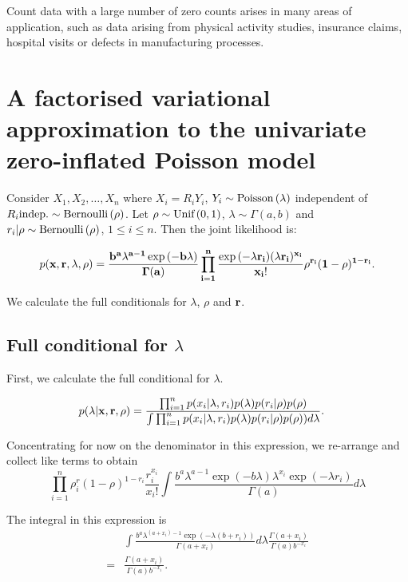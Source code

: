 \documentclass{amsart}
\begin{document}
Count data with a large number of zero counts arises in many areas of
application, such as data arising from physical activity studies, 
insurance claims, hospital visits or defects in manufacturing processes.

\section{A factorised variational approximation to the univariate zero-inflated Poisson model}

\noindent Consider $X_1, X_2, \ldots, X_n$ where $X_i = R_i Y_i$, $Y_i \sim \text{Poisson} \left( \lambda \right)$ independent of
$R_i \text{indep.} \sim \text{Bernoulli} \left( \rho \right)$. Let $\rho \sim \text{Unif} \left( 0, 1 \right)$, 
$\lambda \sim \Gamma(a, b)$ and $r_i | \rho \sim \text{Bernoulli} \left( \rho \right)$, $1 
\leq i \leq n$. Then the joint likelihood is:

$$
p(\bf x, \bf r, \lambda, \rho) = \frac{b^a \lambda^{a - 1} \exp{(-b \lambda)}}{\Gamma{(a)}} \prod_{i=1}^n \frac{\exp{(-\lambda r_i)} (\lambda r_i)^{x_i}}{x_i !} \rho^{r_i} (1 - \rho)^{1 - r_i}.
$$

\noindent We calculate the full conditionals for $\lambda$, $\rho$ and $\bf r$.

\subsection{Full conditional for $\lambda$}
First, we calculate the full conditional for $\lambda$.

\begin{align*}
p(\lambda|\bf x, \bf r, \rho) &= \frac{\prod_{i=1}^n p(x_i | \lambda, r_i) p(\lambda) p(r_i|\rho) p(\rho)}{\int \prod_{i=1}^n p(x_i | \lambda, r_i) p(\lambda) p(r_i|\rho) p(\rho)) d \lambda}.
\end{align*}

Concentrating for now on the denominator in this expression, we re-arrange and collect
like terms to obtain
$$
\prod_{i=1}^n \rho^r_i (1 - \rho)^{1 - r_i} \frac{r_i^{x_i}}{x_i !}
	\int \frac{b^a \lambda^{a - 1} \exp{(-b \lambda)} \lambda^{x_i} \exp{(-\lambda r_i)}}{\Gamma{(a)}} d \lambda
$$

The integral in this expression is
\begin{align*}
& \int \frac{b^a \lambda^{(a + x_i) - 1} \exp{(-\lambda(b + r_i))}}{\Gamma{(a + x_i)}} d \lambda \frac{\Gamma{(a+ x_i)}}{\Gamma{(a)} b^{-x_i}} \\
=& \frac{\Gamma{(a+ x_i)}}{\Gamma{(a)} b^{-x_i}}.
\end{align*}
\end{document}
